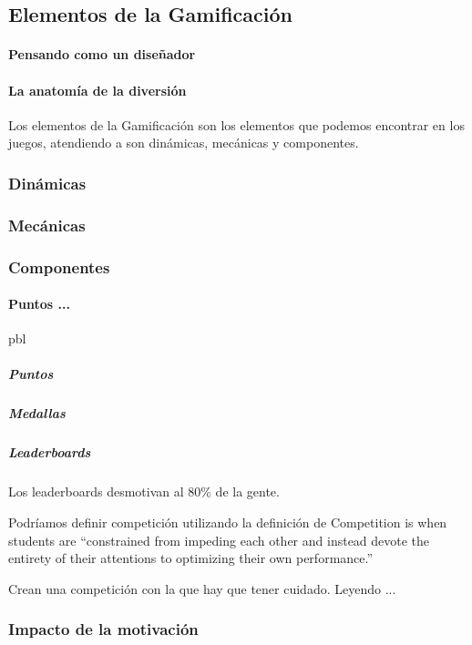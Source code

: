 \subsection{Elementos de la Gamificación}

\paragraph{Pensando como un diseñador}
\paragraph{La anatomía de la diversión}

Los elementos de la Gamificación son los elementos que podemos encontrar en los juegos, atendiendo a \cite{Hunicke04mda:a} son dinámicas, mecánicas y componentes.


\subsubsection{Dinámicas}

\subsubsection{Mecánicas}

\subsubsection{Componentes}



\paragraph{Puntos ...} \gls{pbl}

\subparagraph*{Puntos}

\subparagraph*{Medallas}

\subparagraph*{Leaderboards}

Los leaderboards desmotivan al 80\% de la gente. 

Podríamos definir competición utilizando la definición de \cite{Crawford_CompetitionDef} Competition is when students are “constrained from impeding each other and instead devote the entirety of their attentions to optimizing their own performance.”

Crean una competición con la que hay que tener cuidado. Leyendo \cite{CompetitionInEd}...

\subsubsection{Impacto de la motivación}

